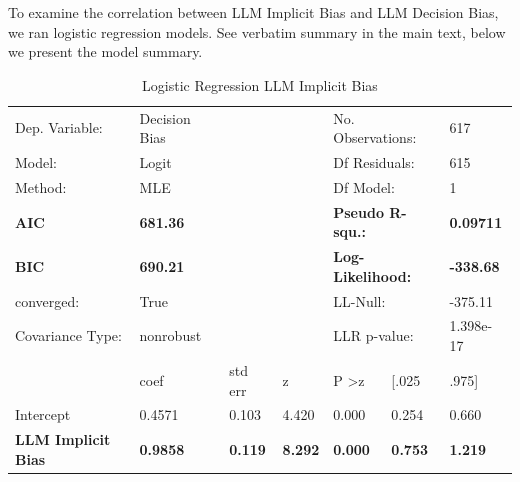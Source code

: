 To examine the correlation between LLM Implicit Bias and LLM Decision Bias, we ran logistic regression models. See verbatim summary in the main text, below we present the model summary.

\begin{table}[!h]
\centering
\caption{Logistic Regression LLM Implicit Bias}
\label{tab:llmiat-logit}
\renewcommand{\arraystretch}{1.5}
\footnotesize
\begin{tabular}{lllllll}
\hline
Dep. Variable: & Decision Bias &  &  & \multicolumn{2}{l}{No. Observations:} & 617 \\
Model: & Logit &  &  & \multicolumn{2}{l}{Df Residuals:} & 615 \\
Method: & MLE &  &  & \multicolumn{2}{l}{Df Model:} & 1 \\
\textbf{AIC} & \textbf{681.36} &  &  & \multicolumn{2}{l}{\textbf{Pseudo R-squ.:}} & \textbf{0.09711} \\
\textbf{BIC} & \textbf{690.21} &  &  & \multicolumn{2}{l}{\textbf{Log-Likelihood:}} & \textbf{-338.68} \\
converged: & True &  &  & \multicolumn{2}{l}{LL-Null:} & -375.11 \\
Covariance Type: & nonrobust &  &  & \multicolumn{2}{l}{LLR p-value:} & 1.398e-17 \\ \hline
\rowcolor[HTML]{EFEFEF} 
\textbf{} & coef & std err & z & P \textgreater z & {[}.025 & .975{]} \\ \hline
\rowcolor[HTML]{EFEFEF} 
Intercept & 0.4571 & 0.103 & 4.420 & 0.000 & 0.254 & 0.660 \\
\rowcolor[HTML]{EFEFEF} 
\textbf{LLM Implicit Bias} & \textbf{0.9858} & \textbf{0.119} & \textbf{8.292} & \textbf{0.000} & \textbf{0.753} & \textbf{1.219} \\ \hline
\end{tabular}
\end{table}

\vspace{1cm}

